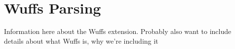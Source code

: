\documentclass[main.tex]{subfiles}
\begin{document}
\section{Wuffs Parsing}
Information here about the Wuffs extension. Probably also want to include
details about what Wuffs is, why we're including it
\end{document}
